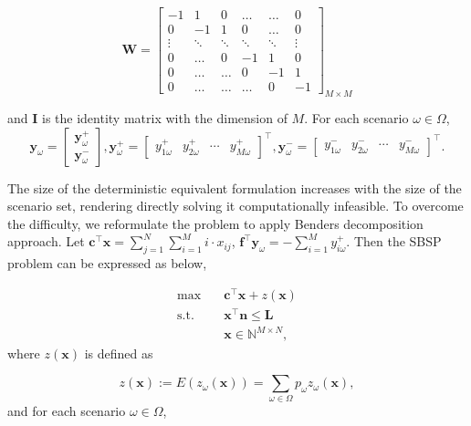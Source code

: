 $$
\mathbf{W}=\left[\begin{array}{cccccc}
-1 & 1 & 0 & \ldots & \ldots & 0 \\
0 & -1 & 1 &    0   & \ldots & 0 \\
\vdots & \ddots & \ddots & \ddots & \ddots & \vdots \\
0  & \ldots   &  0  & -1 & 1 & 0 \\
0  & \ldots   &  \ldots  &  0 &  -1 & 1 \\
0 & \ldots & \ldots & \ldots & 0 & -1
\end{array}\right]_{M \times M}
$$

and $\mathbf{I}$ is the identity matrix with the dimension of $M$. For each scenario $\omega \in \Omega$,
$$
\mathbf{y}_{\omega}=\left[\begin{array}{l}
\mathbf{y}_{\omega}^{+} \\
\mathbf{y}_{\omega}^{-}
\end{array}\right], \mathbf{y}_{\omega}^{+}=\left[\begin{array}{lllll}y_{1 \omega}^{+} & y_{2 \omega}^{+} & \cdots & y_{M \omega}^{+}\end{array}\right]^{\intercal}, \mathbf{y}_{\omega}^{-}=\left[\begin{array}{llll}y_{1 \omega}^{-} & y_{2 \omega}^{-} & \cdots & y_{M \omega}^{-}\end{array}\right]^{\intercal}.
$$

The size of the deterministic equivalent formulation increases with the size of the scenario set, rendering directly solving it computationally infeasible. To overcome the difficulty, we reformulate the problem to apply Benders decomposition approach. Let $\mathbf{c}^{\intercal}\mathbf{x} = \sum_{j =1}^{N} \sum_{i=1}^M i \cdot x_{ij}$, $\mathbf{f}^{\intercal}\mathbf{y}_{\omega} = -\sum_{i=1}^{M} y_{i \omega}^{+}$. Then the SBSP problem can be expressed as below,

\begin{equation}\label{BD_master}
\begin{aligned}
\max \quad & \mathbf{c}^{\intercal} \mathbf{x}+ z(\mathbf{x}) \\
\text {s.t.} \quad & \mathbf{x}^{\intercal} \mathbf{n}  \leq \mathbf{L} \\
& \mathbf{x} \in \mathbb{N}^{M \times N},
\end{aligned}
\end{equation}
where $z(\mathbf{x})$ is defined as

$$z(\mathbf{x}) := E(z_{\omega}(\mathbf{x})) = \sum_{\omega \in \Omega} p_{\omega} z_{\omega}(\mathbf{x}),$$ and for each scenario $\omega \in \Omega$, 


